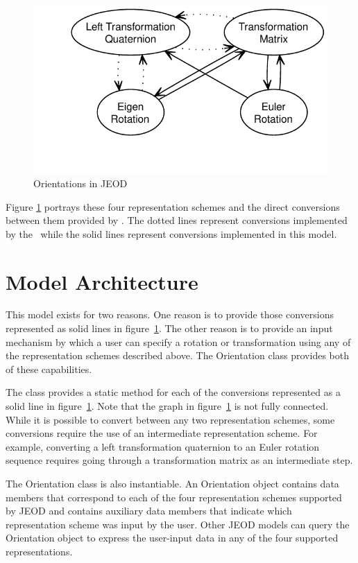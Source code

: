 \begin{figure}[hbtp]
\centering
\includegraphics{representations}
\caption{Orientations in JEOD}
\label{fig:summary_representations}
\end{figure}

Figure \ref{fig:summary_representations} portrays these four representation
schemes and the direct conversions between them provided by \JEODid.
The dotted lines represent conversions implemented by the \QUATERNION~while
the solid lines represent conversions implemented in this model.

\section*{Model Architecture}
This model exists for two reasons. One reason is to provide those conversions
represented as solid lines in figure~\ref{fig:summary_representations}.
The other reason is to provide an input mechanism by which a user can specify
a rotation or transformation using any of the representation schemes described
above. The Orientation class provides both of these capabilities.

The class provides a static method for each of the conversions represented
as a solid line in figure~\ref{fig:summary_representations}.
Note that the graph in figure~\ref{fig:summary_representations} is not
fully connected.  While it is possible to convert between any two representation
schemes, some conversions require the use of an intermediate representation
scheme. For example, converting a left transformation quaternion to an Euler
rotation sequence requires going through a transformation matrix as an
intermediate step.

The Orientation class is also instantiable. An Orientation object contains data
members that correspond to each of the four representation schemes supported by
JEOD and contains auxiliary data members that indicate which representation
scheme was input by the user. Other JEOD models can query the Orientation object
to express the user-input data in any of the four supported representations.

